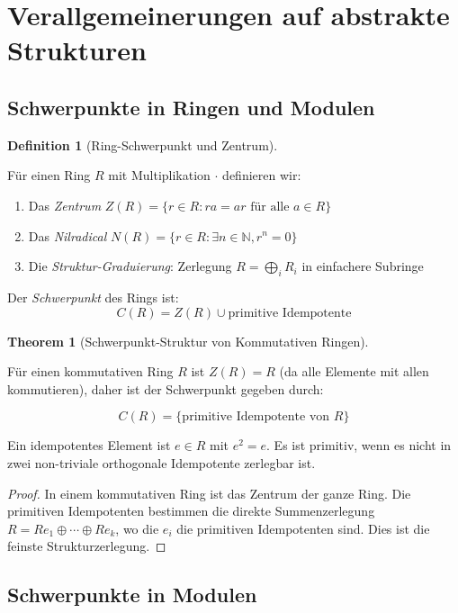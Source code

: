 \documentclass[a4paper,12pt]{article}
\theoremstyle{definition}
\newtheorem{definition}{Definition}
\newtheorem{theorem}{Theorem}
\begin{document}
\section{Verallgemeinerungen auf abstrakte Strukturen}

\subsection{Schwerpunkte in Ringen und Modulen}

\begin{definition}[Ring-Schwerpunkt und Zentrum]
\label{def:ring_zentrum_schwerpunkt}

Für einen Ring $R$ mit Multiplikation $\cdot$ definieren wir:

\begin{enumerate}
\item Das \emph{Zentrum} $Z(R) = \{r \in R : ra = ar \text{ für alle } a \in R\}$
\item Das \emph{Nilradical} $N(R) = \{r \in R : \exists n \in \mathbb{N}, r^n = 0\}$
\item Die \emph{Struktur-Graduierung}: Zerlegung $R = \bigoplus_i R_i$ in einfachere Subringe
\end{enumerate}

Der \emph{Schwerpunkt} des Rings ist:
\[
C(R) = Z(R) \cup \text{primitive Idempotente}
\]
\end{definition}

\begin{theorem}[Schwerpunkt-Struktur von Kommutativen Ringen]
\label{thm:kommutativer_ring_schwerpunkt}

Für einen kommutativen Ring $R$ ist $Z(R) = R$ (da alle Elemente mit allen kommutieren), daher ist der Schwerpunkt gegeben durch:

\[
C(R) = \{\text{primitive Idempotente von } R\}
\]

Ein idempotentes Element ist $e \in R$ mit $e^2 = e$. Es ist primitiv, wenn es nicht in zwei non-triviale orthogonale Idempotente zerlegbar ist.

\begin{proof}
In einem kommutativen Ring ist das Zentrum der ganze Ring. Die primitiven Idempotenten bestimmen die direkte Summenzerlegung $R = Re_1 \oplus \cdots \oplus Re_k$, wo die $e_i$ die primitiven Idempotenten sind. Dies ist die feinste Strukturzerlegung.
\end{proof}
\end{theorem}

\subsection{Schwerpunkte in Modulen}
\end{document}
